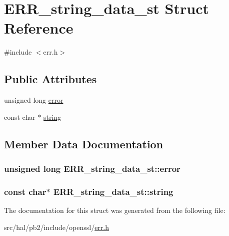 \hypertarget{struct_e_r_r__string__data__st}{}\section{E\+R\+R\+\_\+string\+\_\+data\+\_\+st Struct Reference}
\label{struct_e_r_r__string__data__st}


{\ttfamily \#include $<$err.\+h$>$}

\subsection*{Public Attributes}
\begin{DoxyCompactItemize}
\item 
unsigned long \hyperlink{struct_e_r_r__string__data__st_a31cec2470a4a78675d42e43bca29eb73}{error}
\item 
const char $\ast$ \hyperlink{struct_e_r_r__string__data__st_a8533e685b5daab9b3860db861e468361}{string}
\end{DoxyCompactItemize}


\subsection{Member Data Documentation}
\subsubsection[{\texorpdfstring{error}{error}}]{\setlength{\rightskip}{0pt plus 5cm}unsigned long E\+R\+R\+\_\+string\+\_\+data\+\_\+st\+::error}\hypertarget{struct_e_r_r__string__data__st_a31cec2470a4a78675d42e43bca29eb73}{}\label{struct_e_r_r__string__data__st_a31cec2470a4a78675d42e43bca29eb73}
\subsubsection[{\texorpdfstring{string}{string}}]{\setlength{\rightskip}{0pt plus 5cm}const char$\ast$ E\+R\+R\+\_\+string\+\_\+data\+\_\+st\+::string}\hypertarget{struct_e_r_r__string__data__st_a8533e685b5daab9b3860db861e468361}{}\label{struct_e_r_r__string__data__st_a8533e685b5daab9b3860db861e468361}


The documentation for this struct was generated from the following file\+:\begin{DoxyCompactItemize}
\item 
src/hal/pb2/include/openssl/\hyperlink{err_8h}{err.\+h}\end{DoxyCompactItemize}
